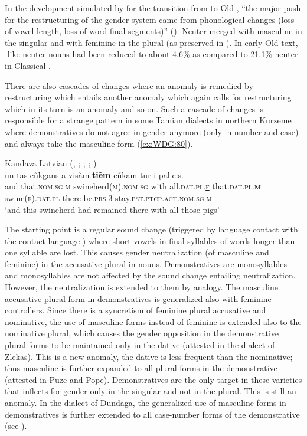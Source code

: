 \documentclass[output=collectionpaper]{langsci/langscibook}
\begin{document}
In the development simulated by \cite{Polinsky2003} for the transition from  to Old , ``the major push for the restructuring of the gender system came from phonological changes (loss of vowel length, loss of word-final segments)'' (\citealt[385]{Polinsky2003}). Neuter merged with masculine in the singular and with feminine in the plural (as preserved in ). In early Old  text, -like neuter nouns had been reduced to about 4.6\% as compared to 21.1\% neuter in Classical .

There are also cascades of changes where an anomaly is remedied by restructuring which entails another anomaly which again calls for restructuring which in its turn is an anomaly and so on. Such a cascade of changes is responsible for a strange pattern in some Tamian  dialects in northern Kurzeme where demonstratives do not agree in gender anymore (only in number and case) and always take the masculine form (\ref{ex:WDG:80}).
\largerpage

\ea\label{ex:WDG:80}
Kandava Latvian (, ; \citealt{Graudina1958}; \citealt[65]{Rudzite1964}; \citealt[144]{Waelchli2018})\\
\gll un	tas	cũkgans	a	\uline{visàm}	\textbf{tiẽm}	\uline{cũkam}	tur	i	palic:s.\\
and	that.\textsc{nom.sg.m}	swineherd\textsc{(m).nom.sg}	with	all.\textsc{dat.pl.\uline{f}}	that.\textsc{dat.pl.\textbf{m}}	swine\textsc{(\uline{f}).dat.pl} there	be.\textsc{prs}.3	stay.\textsc{pst.ptcp.act.nom.sg.m}\\
\glt `and this swineherd had remained there with all those pigs'\\
\z

The starting point is a regular sound change (triggered by language contact with the  contact language ) where short vowels in final syllables of words longer than one syllable are lost. This causes gender neutralization (of masculine and feminine) in the accusative plural in nouns. Demonstratives are monosyllables and monosyllables are not affected by the sound change entailing neutralization. However, the neutralization is extended to them by analogy. The masculine accusative plural form in demonstratives is generalized also with feminine controllers. Since there is a syncretism of feminine plural accusative and nominative, the use of masculine forms instead of feminine is extended also to the nominative plural, which causes the gender opposition in the demonstrative plural forms to be maintained only in the dative (attested in the dialect of Zlēkas). This is a new anomaly, the dative is less frequent than the nominative; thus masculine is further expanded to all plural forms in the demonstrative (attested in Puze and Pope). Demonstratives are the only target in these varieties that inflects for gender only in the singular and not in the plural. This is still an anomaly. In the dialect of Dundaga, the generalized use of masculine forms in demonstratives is further extended to all case-number forms of the demonstrative (see \citealt{Waelchli2017}).
\end{document}
